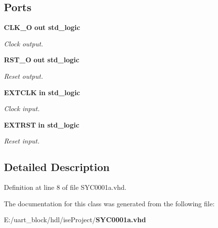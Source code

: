 \subsection*{Ports}
 \begin{DoxyCompactItemize}
\item 
{\bf C\-L\-K\-\_\-\-O}  {\bfseries {\bfseries out }} {\bfseries std\-\_\-logic } \label{class_s_y_c0001a_a47194b29006cd455b0c9239f61a32662}

\begin{DoxyCompactList}\small\item\em Clock output. \end{DoxyCompactList}\item 
{\bf R\-S\-T\-\_\-\-O}  {\bfseries {\bfseries out }} {\bfseries std\-\_\-logic } \label{class_s_y_c0001a_ad526bc5e7968a2200cff030cb9b1d23e}

\begin{DoxyCompactList}\small\item\em Reset output. \end{DoxyCompactList}\item 
{\bf E\-X\-T\-C\-L\-K}  {\bfseries {\bfseries in }} {\bfseries std\-\_\-logic } \label{class_s_y_c0001a_aec20dfafe328406fe05937923ffb3546}

\begin{DoxyCompactList}\small\item\em Clock input. \end{DoxyCompactList}\item 
{\bf E\-X\-T\-R\-S\-T}  {\bfseries {\bfseries in }} {\bfseries std\-\_\-logic } \label{class_s_y_c0001a_a5242034b20a8e2bd36922221b2791426}

\begin{DoxyCompactList}\small\item\em Reset input. \end{DoxyCompactList}\end{DoxyCompactItemize}


\subsection{Detailed Description}


Definition at line 8 of file S\-Y\-C0001a.\-vhd.



The documentation for this class was generated from the following file\-:\begin{DoxyCompactItemize}
\item 
E\-:/uart\-\_\-block/hdl/ise\-Project/{\bf S\-Y\-C0001a.\-vhd}\end{DoxyCompactItemize}
